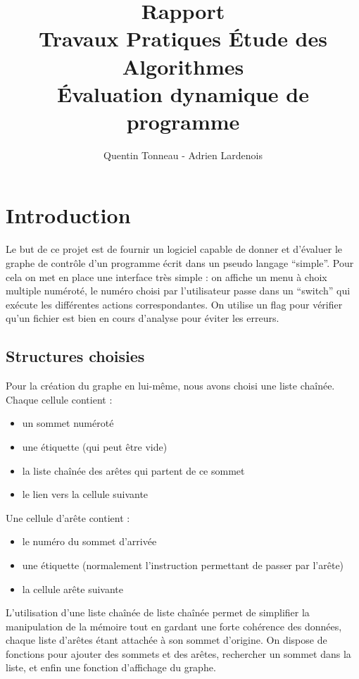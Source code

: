 \documentclass[a4paper,11pt]{article}
\title {Rapport \\ Travaux Pratiques Étude des Algorithmes \\ Évaluation dynamique de programme}
\author {Quentin Tonneau - Adrien Lardenois}
\date{}
\begin{document}
	\maketitle %
	\tableofcontents %
	\newpage %
	
	
	\section{Introduction}
	Le but de ce projet est de fournir un logiciel capable de donner et d'évaluer le graphe de contrôle d'un programme écrit dans un pseudo langage ``simple''. Pour cela on met en place une interface très simple : on affiche un menu à choix multiple numéroté, le numéro choisi par l'utilisateur passe dans un ``switch'' qui exécute les différentes actions correspondantes. On utilise un flag pour vérifier qu'un fichier est bien en cours d'analyse pour éviter les erreurs.
	\subsection{Structures choisies}
	Pour la création du graphe en lui-même, nous avons  choisi une liste chaînée. Chaque cellule contient :
	\begin{itemize}
		\item un sommet numéroté
		\item une étiquette (qui peut être vide)
		\item la liste chaînée des arêtes qui partent de ce sommet
		\item le lien vers la cellule suivante
	\end{itemize}
	Une cellule d'arête contient : 
	\begin{itemize}
		\item le numéro du sommet d'arrivée 
		\item une étiquette (normalement l'instruction permettant de passer par l'arête)
		\item la cellule arête suivante
	\end{itemize}
	
	L'utilisation d'une liste chaînée de liste chaînée permet de simplifier la manipulation de la mémoire tout en gardant une forte cohérence des données, chaque liste d'arêtes étant attachée à son sommet d'origine. On dispose de fonctions pour ajouter des sommets et des arêtes, rechercher un sommet dans la liste, et enfin une fonction d'affichage du graphe.
\end{document}
